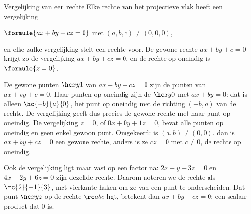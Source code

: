 \begin{theorie}
\begin{stelling}{Vergelijking van een rechte}
Elke rechte van het projectieve vlak heeft een vergelijking

\vspace{1mm}
\qquad $\formule{ax + by + cz = 0}$ \qquad met $(a, b, c) \neq (0, 0, 0)$,

\vspace{1mm}
en elke zulke vergelijking stelt een rechte voor. De gewone rechte $ax + by + c = 0$ krijgt zo de vergelijking $ax + by + cz = 0$, en de rechte op oneindig is $\formule{z = 0}$.
\end{stelling}

\begin{bewijs}
De gewone punten $\hc xy1$ van $ax + by + cz = 0$ zijn de punten van $ax + by + c = 0$. Haar punten op oneindig zijn de $\hc xy0$ met $ax + by = 0$: dat is alleen $\hc{-b}{a}{0}$, het punt op oneindig met de richting $(-b, a)$ van de rechte. De vergelijking geeft dus precies de gewone rechte met haar punt op oneindig. De vergelijking $z = 0$, of $0x + 0y + 1z = 0$, bevat alle punten op oneindig en geen enkel gewoon punt. Omgekeerd: is $(a, b) \neq (0, 0)$, dan is $ax + by + cz = 0$ een gewone rechte, anders is ze $cz = 0$ met $c \neq 0$, de rechte op oneindig.
\end{bewijs}
\end{theorie}

Ook de vergelijking ligt maar vast op een factor na: $2x - y + 3z = 0$ en $4x - 2y + 6z = 0$ zijn dezelfde rechte. Daarom noteren we de rechte als $\rc{2}{-1}{3}$, met vierkante haken om ze van een punt te onderscheiden. Dat punt $\hc xyz$ op de rechte $\rc abc$ ligt, betekent dan $ax + by + cz = 0$: een scalair product dat 0 is.


\begin{oefeningen}
\end{oefeningen}

